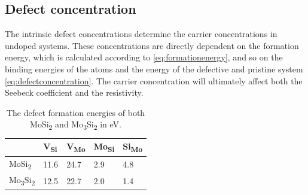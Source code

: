 \documentclass[12pt]{article}
\theoremstyle{plain}
\theoremstyle{definition}
\newcommand{\<}{\langle}
\renewcommand{\>}{\rangle}
\begin{document}
\subsection{Defect concentration}

The intrinsic defect concentrations determine the carrier concentrations in undoped systems. These concentrations are directly dependent on the formation energy, which is calculated according to \ref{eq:formationenergy}, and so on the binding energies of the atoms and the energy of the defective and pristine system \ref{eq:defectconcentration}. The carrier concentration will ultimately affect both the Seebeck coefficient and the resistivity.

\begin{table}[t!]
\caption{The defect formation energies of both MoSi\textsubscript{2} and Mo\textsubscript{3}Si\textsubscript{2} in eV.}
\centering
\begin{tabular}{@{}lllll@{}}
\toprule
      & V\textsubscript{Si}  & V\textsubscript{Mo}  & Mo\textsubscript{Si} & Si\textsubscript{Mo} \\ \midrule
MoSi\textsubscript{2} & 11.6 & 24.7 & 2.9  & 4.8  \\
Mo\textsubscript{3}Si\textsubscript{2} & 12.5 & 22.7 & 2.0  & 1.4 
\end{tabular}
\end{table}
\end{document}
